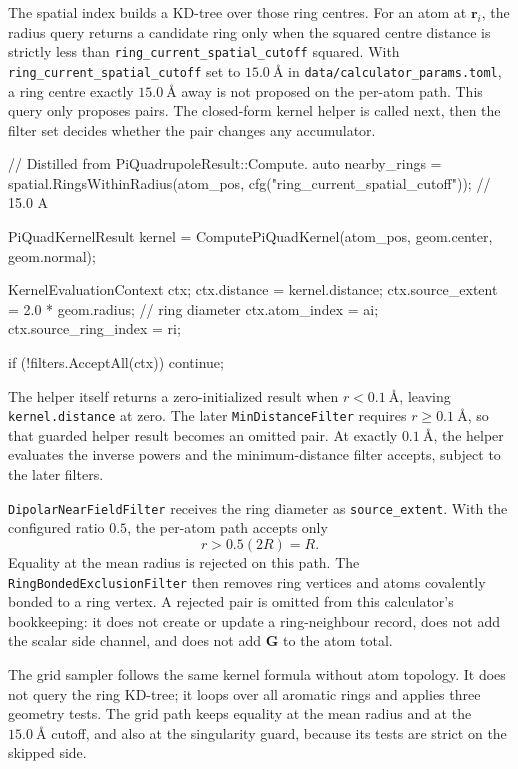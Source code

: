 \documentclass[11pt]{article}
\newcommand{\code}[1]{\texttt{#1}}
\begin{document}
The spatial index builds a KD-tree over those ring centres. For an atom at
\(\bm r_i\), the radius query returns a candidate ring only when the squared
centre distance is strictly less than \code{ring\_current\_spatial\_cutoff}
squared. With \code{ring\_current\_spatial\_cutoff} set to
\(\SI{15.0}{\angstrom}\) in \code{data/calculator\_params.toml}, a ring centre
exactly \(\SI{15.0}{\angstrom}\) away is not proposed on the per-atom path.
This query only proposes pairs. The
closed-form kernel helper is called next, then the filter set decides whether
the pair changes any accumulator.

\begin{codebox}
// Distilled from PiQuadrupoleResult::Compute.
auto nearby_rings =
    spatial.RingsWithinRadius(atom_pos,
        cfg("ring_current_spatial_cutoff"));       // 15.0 A

PiQuadKernelResult kernel =
    ComputePiQuadKernel(atom_pos, geom.center, geom.normal);

KernelEvaluationContext ctx;
ctx.distance = kernel.distance;
ctx.source_extent = 2.0 * geom.radius;             // ring diameter
ctx.atom_index = ai;
ctx.source_ring_index = ri;

if (!filters.AcceptAll(ctx)) continue;
\end{codebox}

The helper itself returns a zero-initialized result when
\(r<\SI{0.1}{\angstrom}\), leaving \code{kernel.distance} at zero. The later
\code{MinDistanceFilter} requires \(r\ge\SI{0.1}{\angstrom}\), so that guarded
helper result becomes an omitted pair. At exactly
\(\SI{0.1}{\angstrom}\), the helper evaluates the inverse powers and the
minimum-distance filter accepts, subject to the later filters.

\code{DipolarNearFieldFilter} receives the ring diameter as
\code{source\_extent}. With the configured ratio \(0.5\), the per-atom path
accepts only
\[
  r > 0.5(2R)=R .
\]
Equality at the mean radius is rejected on this path. The
\code{RingBondedExclusionFilter} then removes ring vertices and atoms
covalently bonded to a ring vertex. A rejected pair is omitted from this
calculator's bookkeeping: it
does not create or update a ring-neighbour record, does not add the scalar
side channel, and does not add \(\bm G\) to the atom total.

The grid sampler follows the same kernel formula without atom topology. It
does not query the ring KD-tree; it loops over all aromatic rings and applies
three geometry tests. The grid path keeps equality at the mean radius and at
the \(\SI{15.0}{\angstrom}\) cutoff, and also at the singularity guard, because
its tests are strict on the skipped side.
\end{document}
